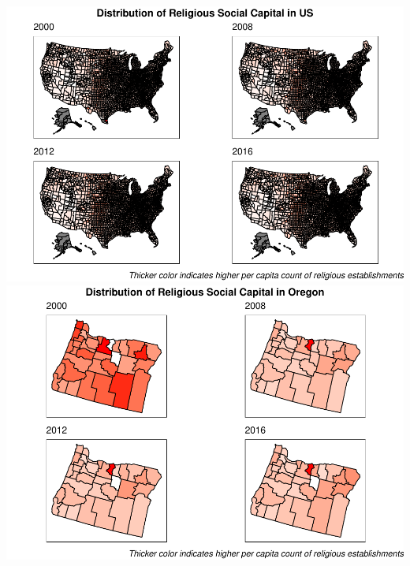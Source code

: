 \documentclass[
  english,
  man]{apa6}
\begin{document}
\includegraphics{Script_files/figure-latex/visualization religious capital maps-1.pdf} \includegraphics{Script_files/figure-latex/visualization religious capital maps-2.pdf}
\end{document}
